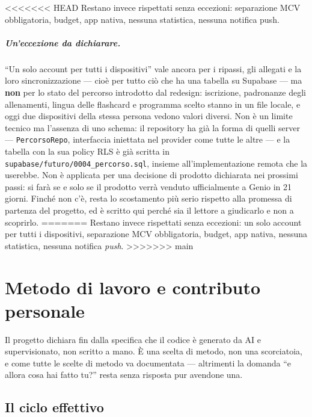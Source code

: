 \documentclass[11pt,a4paper]{report}
\begin{document}
<<<<<<< HEAD
Restano invece rispettati senza eccezioni: separazione MCV obbligatoria,
budget, app nativa, nessuna statistica, nessuna notifica push.

\paragraph{Un'eccezione da dichiarare.} ``Un solo account per tutti i
dispositivi'' vale ancora per i ripassi, gli allegati e la loro
sincronizzazione — cio\`e per tutto ci\`o che ha una tabella su Supabase — ma
\textbf{non} per lo stato del percorso introdotto dal redesign: iscrizione,
padronanze degli allenamenti, lingua delle flashcard e programma scelto stanno
in un file locale, e oggi due dispositivi della stessa persona vedono valori
diversi. Non \`e un limite tecnico ma l'assenza di uno schema: il repository ha
gi\`a la forma di quelli server --- \texttt{PercorsoRepo}, interfaccia iniettata
nel provider come tutte le altre --- e la tabella con la sua policy RLS \`e
gi\`a scritta in \texttt{supabase/futuro/0004\_percorso.sql}, insieme
all'implementazione remota che la userebbe. Non \`e applicata per una decisione
di prodotto dichiarata nei prossimi passi: si far\`a se e solo se il prodotto
verr\`a venduto ufficialmente a Genio in 21 giorni. Finch\'e non c'\`e, resta
lo scostamento pi\`u serio rispetto alla promessa di partenza del progetto, ed
\`e scritto qui perch\'e sia il lettore a giudicarlo e non a scoprirlo.
=======
Restano invece rispettati senza eccezioni: un solo account per tutti i
dispositivi, separazione MCV obbligatoria, budget, app nativa, nessuna
statistica, nessuna notifica \emph{push}.
>>>>>>> main

\chapter{Metodo di lavoro e contributo personale}

Il progetto dichiara fin dalla specifica che il codice \`e generato da AI e
supervisionato, non scritto a mano. \`E una scelta di metodo, non una
scorciatoia, e come tutte le scelte di metodo va documentata --- altrimenti la
domanda ``e allora cosa hai fatto tu?'' resta senza risposta pur avendone una.

\section{Il ciclo effettivo}
\end{document}
